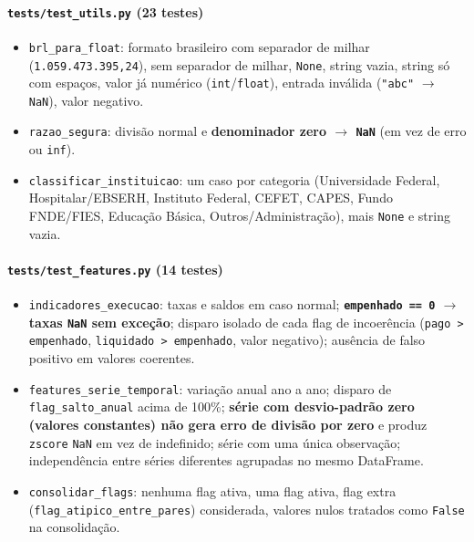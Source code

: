 \documentclass[11pt,a4paper]{article}
\begin{document}
\paragraph{\texttt{tests/test\_utils.py} (23 testes)}
\begin{itemize}
    \item \texttt{brl\_para\_float}: formato brasileiro com separador de
    milhar (\texttt{1.059.473.395,24}), sem separador de milhar,
    \texttt{None}, string vazia, string só com espaços, valor já numérico
    (\texttt{int}/\texttt{float}), entrada inválida (\texttt{"abc"}
    $\rightarrow$ \texttt{NaN}), valor negativo.
    \item \texttt{razao\_segura}: divisão normal e \textbf{denominador zero
    $\rightarrow$ \texttt{NaN}} (em vez de erro ou \texttt{inf}).
    \item \texttt{classificar\_instituicao}: um caso por categoria
    (Universidade Federal, Hospitalar/EBSERH, Instituto Federal, CEFET,
    CAPES, Fundo FNDE/FIES, Educação Básica, Outros/Administração), mais
    \texttt{None} e string vazia.
\end{itemize}

\paragraph{\texttt{tests/test\_features.py} (14 testes)}
\begin{itemize}
    \item \texttt{indicadores\_execucao}: taxas e saldos em caso normal;
    \textbf{\texttt{empenhado == 0} $\rightarrow$ taxas \texttt{NaN} sem
    exceção}; disparo isolado de cada flag de incoerência (\texttt{pago >
    empenhado}, \texttt{liquidado > empenhado}, valor negativo); ausência
    de falso positivo em valores coerentes.
    \item \texttt{features\_serie\_temporal}: variação anual ano a ano;
    disparo de \texttt{flag\_salto\_anual} acima de 100\%; \textbf{série
    com desvio-padrão zero (valores constantes) não gera erro de divisão
    por zero} e produz \texttt{zscore} \texttt{NaN} em vez de indefinido;
    série com uma única observação; independência entre séries diferentes
    agrupadas no mesmo DataFrame.
    \item \texttt{consolidar\_flags}: nenhuma flag ativa, uma flag ativa,
    flag extra (\texttt{flag\_atipico\_entre\_pares}) considerada, valores
    nulos tratados como \texttt{False} na consolidação.
\end{itemize}
\end{document}
